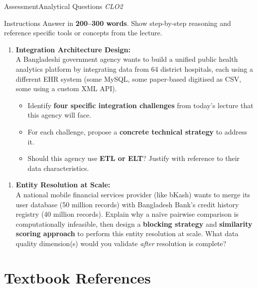\documentclass[aspectratio=169,10pt]{beamer}
\begin{document}
\begin{frame}{Assessment\textemdash Analytical Questions \hfill\small\textit{CLO2}}
  \begin{block}{Instructions}
    Answer in \textbf{200--300 words}.  Show step-by-step reasoning and reference specific tools or concepts from the lecture.
  \end{block}
  \vspace{6pt}
  \begin{enumerate}[\textbf{A1.}]
    \item \textbf{Integration Architecture Design:}\\
    A Bangladeshi government agency wants to build a unified public health analytics platform by integrating data from 64 district hospitals, each using a different EHR system (some MySQL, some paper-based digitised as CSV, some using a custom XML API).
    \begin{itemize}
      \small
      \item Identify \textbf{four specific integration challenges} from today's lecture that this agency will face.
      \item For each challenge, propose a \textbf{concrete technical strategy} to address it.
      \item Should this agency use \textbf{ETL or ELT}?  Justify with reference to their data characteristics.
    \end{itemize}
  \end{enumerate}
  \vspace{6pt}
  \begin{enumerate}[\textbf{A2.}]
    \item \textbf{Entity Resolution at Scale:}\\
    A national mobile financial services provider (like bKash) wants to merge its user database (50 million records) with Bangladesh Bank's credit history registry (40 million records).  Explain why a na\"ive pairwise comparison is computationally infeasible, then design a \textbf{blocking strategy} and \textbf{similarity scoring approach} to perform this entity resolution at scale.  What data quality dimension(s) would you validate \emph{after} resolution is complete?
  \end{enumerate}
\end{frame}

\section*{Textbook References}
\end{document}
